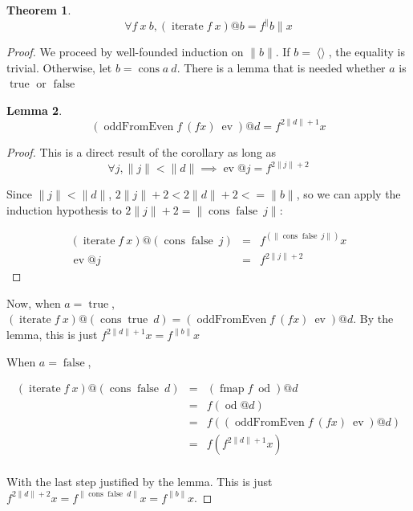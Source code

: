 \documentclass{article}
\DeclareMathOperator{\oddFrom}{oddFromEven}
\DeclareMathOperator{\nil}{\langle\rangle}
\DeclareMathOperator{\cons}{cons}
\DeclareMathOperator{\true}{true}
\DeclareMathOperator{\false}{false}
\DeclareMathOperator{\fmap}{fmap}
\DeclareMathOperator{\iter}{iterate}
\newcommand{\ord}[1]{\|#1\|}
\DeclareMathOperator{\ev}{ev}
\DeclareMathOperator{\od}{od}
\newtheorem{theorem}{Theorem}
\newtheorem{lemma}[theorem]{Lemma}
\begin{document}
\begin{theorem}
\begin{displaymath}
\forall f\ x\ b, (\iter f\ x)@b = f^\ord{b} x
\end{displaymath}
\end{theorem}
\begin{proof}

We proceed by well-founded induction on $\ord{b}$.
If $b = \nil$, the equality is trivial.
Otherwise, let $b = \cons a\ d$.
There is a lemma that is needed whether $a$ is $\true$ or $\false$

\begin{lemma}
\begin{displaymath}
(\oddFrom f\ (f x)\ \ev)@d = f^{2\ord{d}+1}x
\end{displaymath}
\end{lemma}
\begin{proof}
This is a direct result of the corollary as long as 
\begin{displaymath}
\forall j, \ord{j} < \ord{d} \implies \ev @j = f^{2\ord{j}+2}
\end{displaymath}

Since $\ord{j} < \ord{d}$, $2\ord{j}+2 < 2\ord{d}+2 <= \ord{b}$, so we can apply the induction hypothesis to $2\ord{j}+2 = \ord{\cons \false\ j}$:

\begin{displaymath}
\begin{array}{rcl}
(\iter f\ x)@(\cons \false\ j) & = & f^(\ord{\cons \false\ j}) x \\
\ev @j & = & f^{2\ord{j}+2}
\end{array}
\end{displaymath}

\end{proof}

Now, when $a = \true$, $(\iter f\ x)@(\cons \true\ d) = (\oddFrom f\ (f x)\ \ev)@d$.
By the lemma, this is just $f^{2\ord{d}+1}x = f^{\ord{b}}x$

When $a = \false$, 

\begin{displaymath}
\begin{array}{rcl}
(\iter f\ x)@(\cons \false\ d) & = & (\fmap f\ \od)@d \\
& = & f(\od @d) \\
& = & f((\oddFrom f\ (f x)\ \ev)@d) \\
& = & f(f^{2\ord{d}+1}x) \\
\end{array}
\end{displaymath}

With the last step justified by the lemma. This is just $f^{2\ord{d}+2}x = f^{\ord{\cons \false\ d}}x = f^{\ord{b}}x$.

\end{proof}



\end{document}

